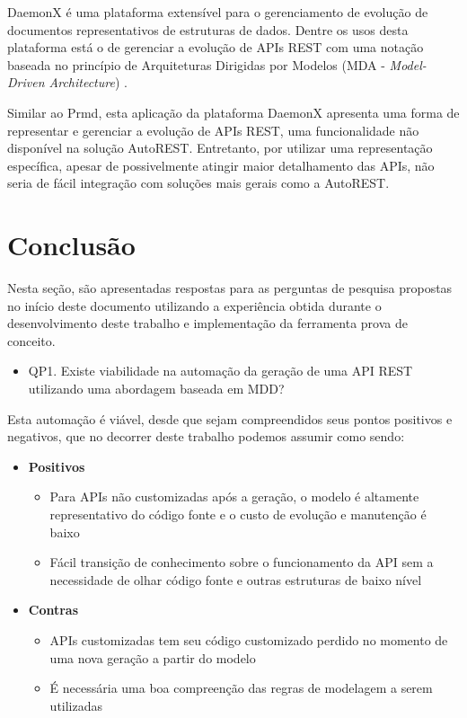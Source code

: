 DaemonX é uma plataforma extensível para o gerenciamento de evolução de documentos representativos de estruturas de dados. Dentre os usos desta plataforma está o de gerenciar a evolução de APIs REST com uma notação baseada no princípio de Arquiteturas Dirigidas por Modelos (MDA - \textit{Model-Driven Architecture}) \cite{POLAK:2015}.

Similar ao Prmd, esta aplicação da plataforma DaemonX apresenta uma forma de representar e gerenciar a evolução de APIs REST, uma funcionalidade não disponível na solução AutoREST. Entretanto, por utilizar uma representação específica, apesar de possivelmente atingir maior detalhamento das APIs, não seria de fácil integração com soluções mais gerais como a AutoREST.


\section{Conclusão}

Nesta seção, são apresentadas respostas para as perguntas de pesquisa propostas no início deste documento utilizando a experiência obtida durante o desenvolvimento deste trabalho e implementação da ferramenta prova de conceito.

\begin{itemize}
	\item QP1. Existe viabilidade na automação da geração de uma API REST utilizando uma abordagem baseada em MDD?
\end{itemize}

Esta automação é viável, desde que sejam compreendidos seus pontos positivos e negativos, que no decorrer deste trabalho podemos assumir como sendo:

\begin{itemize}
	\item \textbf{Positivos}
	\begin{itemize}
		\item Para APIs não customizadas após a geração, o modelo é altamente representativo do código fonte e o custo de evolução e manutenção é baixo
		\item Fácil transição de conhecimento sobre o funcionamento da API sem a necessidade de olhar código fonte e outras estruturas de baixo nível
	\end{itemize}
	\item \textbf{Contras}
	\begin{itemize}
		\item APIs customizadas tem seu código customizado perdido no momento de uma nova geração a partir do modelo
		\item É necessária uma boa compreenção das regras de modelagem a serem utilizadas
	\end{itemize}
\end{itemize}

